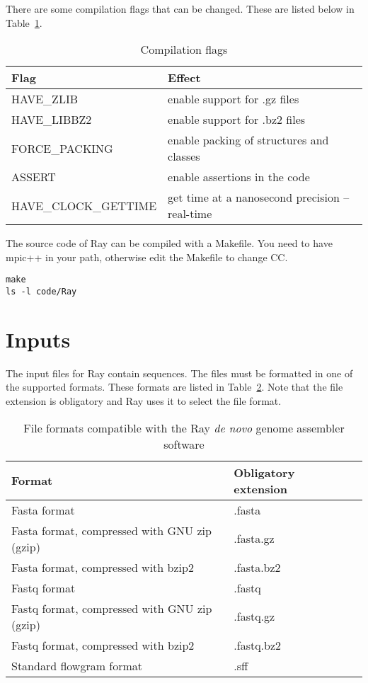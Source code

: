 \documentclass{article}
\begin{document}
There are some compilation flags that can be changed. These are listed below in Table~\ref{flags}.


\begin{table}[h]
\caption{Compilation flags}\label{flags}
\begin{tabular}{ll}
\hline
Flag & Effect  \\
\hline
HAVE\_ZLIB & enable support for .gz files \\
HAVE\_LIBBZ2 & enable support for .bz2 files \\
FORCE\_PACKING & enable packing of structures and classes\\
ASSERT & enable assertions in the code \\
HAVE\_CLOCK\_GETTIME & get time at a nanosecond precision -- real-time \\
\hline
\end{tabular}
\end{table}

The source code of Ray can be compiled with a Makefile.
You need to have mpic++ in your path, otherwise edit the Makefile to change CC.


\begin{verbatim}
make 
ls -l code/Ray
\end{verbatim}

\section{Inputs}

The input files for Ray contain sequences. The files must be formatted in one of the supported formats.
These formats are listed in Table~\ref{formats}. Note that the file extension is obligatory and Ray uses it
to select the file format.

\begin{table}[h]
\caption{File formats compatible with the Ray \emph{de novo} genome assembler software}\label{formats}
\begin{tabular}{lll}
\hline
Format & Obligatory extension \\
\hline
Fasta format & .fasta\\
Fasta format, compressed with GNU zip (gzip) & .fasta.gz \\
Fasta format, compressed with bzip2 & .fasta.bz2 \\
Fastq format & .fastq\\
Fastq format, compressed with GNU zip (gzip) & .fastq.gz \\
Fastq format, compressed with bzip2 & .fastq.bz2 \\
Standard flowgram format & .sff \\
\hline
\end{tabular}
\end{table}
\end{document}
